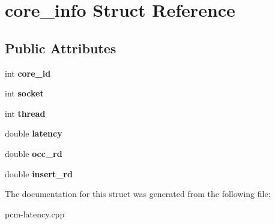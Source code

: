 \section{core\+\_\+info Struct Reference}
\label{structcore__info}
\subsection*{Public Attributes}
\begin{DoxyCompactItemize}
\item 
\mbox{\label{structcore__info_ae584707edb5a05e6abc40dab30b3d2c9}} 
int {\bfseries core\+\_\+id}
\item 
\mbox{\label{structcore__info_a8b8ea1d420048e8d11fee9c480b13fc4}} 
int {\bfseries socket}
\item 
\mbox{\label{structcore__info_ad7a82ab8ed8b54f67ad06c197047f6b0}} 
int {\bfseries thread}
\item 
\mbox{\label{structcore__info_aaf9bc5456520774fe50cc9bc59085879}} 
double {\bfseries latency}
\item 
\mbox{\label{structcore__info_a116538418f53d9e9740fa61b3508cbc7}} 
double {\bfseries occ\+\_\+rd}
\item 
\mbox{\label{structcore__info_a801468c2f4f0d52480341aa5334c3a8f}} 
double {\bfseries insert\+\_\+rd}
\end{DoxyCompactItemize}


The documentation for this struct was generated from the following file\+:\begin{DoxyCompactItemize}
\item 
pcm-\/latency.\+cpp\end{DoxyCompactItemize}
